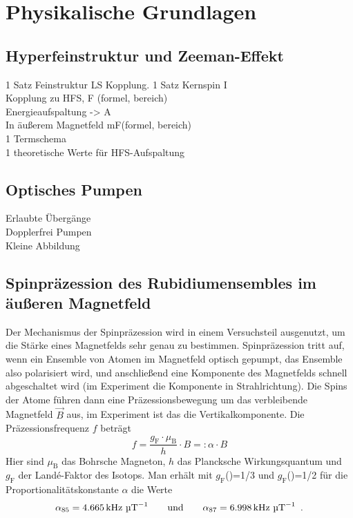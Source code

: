 \section{Physikalische Grundlagen}

\subsection{Hyperfeinstruktur und Zeeman-Effekt}
1 Satz Feinstruktur LS Kopplung. 1 Satz Kernspin I \\
Kopplung zu HFS, F (formel, bereich) \\
Energieaufspaltung -> A \\
In äußerem Magnetfeld mF(formel, bereich) \\
1 Termschema \\
1 theoretische Werte für HFS-Aufspaltung

\subsection{Optisches Pumpen}
Erlaubte Übergänge \\
Dopplerfrei Pumpen \\
Kleine Abbildung 

\subsection{Spinpräzession des Rubidiumensembles im äußeren Magnetfeld}
Der Mechanismus der Spinpräzession wird in einem Versuchsteil ausgenutzt,
um die Stärke eines Magnetfelds sehr genau zu bestimmen.
Spinpräzession tritt auf, wenn ein Ensemble von Atomen im Magnetfeld optisch gepumpt,
das Ensemble also polarisiert wird, und anschließend eine Komponente
des Magnetfelds schnell abgeschaltet wird (im Experiment die Komponente in Strahlrichtung).
Die Spins der Atome führen dann eine Präzessionsbewegung um das verbleibende Magnetfeld $\vec{B}$ aus,
im Experiment ist das die Vertikalkomponente.  %
Die Präzessionsfrequenz $f$ beträgt \cite{staatsex}
\begin{equation}
    \label{eq:gr:spinpräz}
    f=\frac{g_\text{F} \cdot \mu_\text{B}}{h} \cdot B=: \alpha \cdot B
\end{equation}
Hier sind $\mu_\text{B}$ das Bohrsche Magneton, $h$ das Plancksche Wirkungsquantum und
$g_\text{F}$ der Landé-Faktor des Isotops.
Man erhält mit $g_\text{F}$()=1/3 und $g_\text{F}$()=1/2 \cite{staatsex} für
die Proportionalitätskonstante $\alpha$ die Werte
\begin{equation}
    \label{eq:gr:alpha}
    \alpha_{85}=4.665\,\text{kHz } \text{\textmu T}^{-1} \qquad \text{und} \qquad	\alpha_{87}=6.998\,\text{kHz } \text{\textmu T}^{-1} \ \, .
\end{equation}

